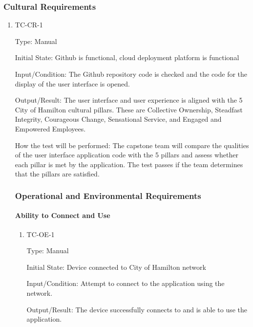 \documentclass[12pt, titlepage]{article}
\begin{document}
\subsubsection{Cultural Requirements}

\begin{enumerate}
  \item{TC-CR-1\\}

    Type: Manual

    Initial State: Github is functional, cloud deployment platform is functional

    Input/Condition: The Github repository code is checked and the code for the
    display of the user interface is opened.

    Output/Result: The user interface and user experience is aligned with the 5
    City of Hamilton cultural pillars. These are Collective Ownership,
    Steadfast Integrity, Courageous Change, Sensational Service, and
    Engaged and Empowered Employees.

    How the test will be performed: The capstone team will compare the qualities
    of the user interface application code with the 5 pillars and assess whether
    each pillar is met by the application. The test passes if the
    team determines
    that the pillars are satisfied.

    \subsubsection{Operational and Environmental Requirements}

    \paragraph{Ability to Connect and Use}

    \begin{enumerate}

      \item{TC-OE-1\\}

        Type: Manual

        Initial State: Device connected to City of Hamilton network

        Input/Condition: Attempt to connect to the application using
        the network.

        Output/Result: The device successfully connects to and is able to
        use the application.


\end{enumerate}
\end{enumerate}
\end{document}

